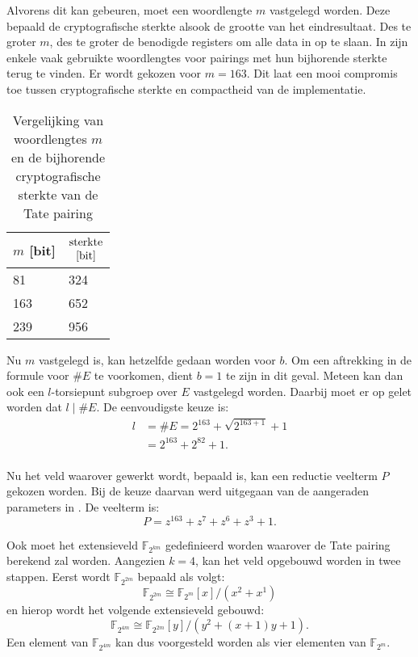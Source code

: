 Alvorens dit kan gebeuren, moet een woordlengte $m$ vastgelegd worden. Deze bepaald de cryptografische sterkte alsook de grootte van het eindresultaat. Des te groter $m$, des te groter de benodigde registers om alle data in op te slaan. In  zijn enkele vaak gebruikte woordlengtes voor pairings met hun bijhorende sterkte terug te vinden. Er wordt gekozen voor $m = 163$. Dit laat een mooi compromis toe tussen cryptografische sterkte en compactheid van de implementatie.

\begin{table}[h]
	\caption{Vergelijking van woordlengtes $m$ en de bijhorende cryptografische sterkte van de Tate pairing}
	\label{tabel-implementatie-parameters-keylength}

	\centering
	\begin{tabular}{ll}
		\toprule
		$m$ [bit]	& $\begin{array}{@{}c@{}}\text{sterkte}\\\text{[bit]}\end{array}$\\
		\midrule
		81		& 324\\
		163	& 652\\
		239	& 956\\
		\bottomrule		
	\end{tabular}
\end{table}

Nu $m$ vastgelegd is, kan hetzelfde gedaan worden voor $b$. Om een aftrekking in de formule voor $\#E$ te voorkomen, dient $b = 1$ te zijn in dit geval. Meteen kan dan ook een $l$-torsiepunt subgroep over $E$ vastgelegd worden. Daarbij moet er op gelet worden dat $l \mid \#E$. De eenvoudigste keuze is:
\[\begin{aligned}
l	&= \#E = 2^{163} + \sqrt{2^{163 + 1}} + 1\\
	&= 2^{163} + 2^{82} + 1.\\
\end{aligned}\]

Nu het veld waarover gewerkt wordt, bepaald is, kan een reductie veelterm $P$ gekozen worden. Bij de keuze daarvan werd uitgegaan van de aangeraden parameters in \cite{sec2}. De veelterm is:
\[P = z^{163} + z^7 + z^6 + z^3 + 1.\]

Ook moet het extensieveld $\mathbb{F}_{2^{k m}}$ gedefinieerd worden waarover de Tate pairing berekend zal worden. Aangezien $k = 4$, kan het veld opgebouwd worden in twee stappen. Eerst wordt $\mathbb{F}_{2^{2m}}$ bepaald als volgt:
\[\mathbb{F}_{2^{2m}} \cong \mathbb{F}_{2^m}[x]/(x^2 + x ^ 1)\]
en hierop wordt het volgende extensieveld gebouwd:
\[\mathbb{F}_{2^{4m}} \cong \mathbb{F}_{2^{2m}}[y]/(y^2 + (x + 1)y + 1).\]
Een element van $\mathbb{F}_{2^{4m}}$ kan dus voorgesteld worden als vier elementen van $\mathbb{F}_{2^m}$.


